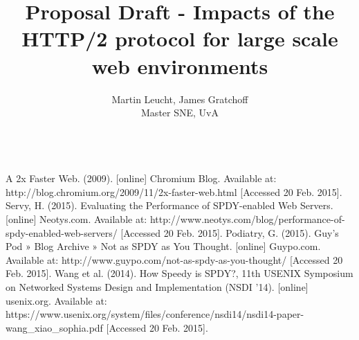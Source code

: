 \documentclass{article}
\begin{document}
 
\begin{figure}[!bh]
 	\begin{center}
		\huge \title{Proposal Draft - Impacts of the HTTP/2 protocol for large scale web environments}
		\author{Martin Leucht, James Gratchoff \\
		Master SNE, UvA} 
	\maketitle 
		\label{sec:uva}
	\end{center}
\end{figure}
\setlength{\columnsep}{2cm}
\def\columnseprulecolor{\color{blue}}
 










\begin{thebibliography}
\\
A 2x Faster Web. (2009). [online] Chromium Blog. Available at: http://blog.chromium.org/2009/11/2x-faster-web.html [Accessed 20 Feb. 2015].
Servy, H. (2015). Evaluating the Performance of SPDY-enabled Web Servers. [online] Neotys.com. Available at: http://www.neotys.com/blog/performance-of-spdy-enabled-web-servers/ [Accessed 20 Feb. 2015].
Podiatry, G. (2015). Guy's Pod » Blog Archive » Not as SPDY as You Thought. [online] Guypo.com. Available at: http://www.guypo.com/not-as-spdy-as-you-thought/ [Accessed 20 Feb. 2015].
Wang et al. (2014). How Speedy is SPDY?, 11th USENIX Symposium on Networked Systems Design and Implementation (NSDI ’14). [online] usenix.org. Available at:
https://www.usenix.org/system/files/conference/nsdi14/nsdi14-paper-wang\_xiao\_sophia.pdf [Accessed 20 Feb. 2015].
\end{thebibliography}
\newpage
\appendix
\end{document}
